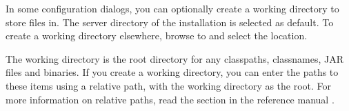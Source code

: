 
In some \gdaut{} configuration dialogs, you can optionally create a working directory to store files in. The server directory of the installation is selected as default. To create a working directory elsewhere, browse to and select the location. 

The working directory is the root directory for any classpaths, classnames, JAR files and binaries. If you create a working directory, you can enter the paths to these items using a relative path, with the working directory as the root. For more information on relative paths, read the section in the reference manual . 
